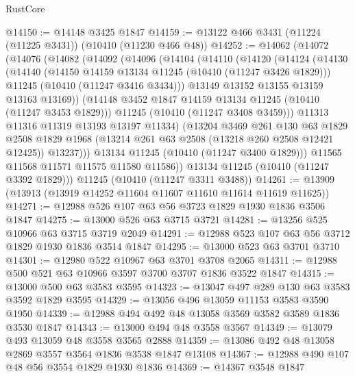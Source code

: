 \begin{lexlean}{RustCore}
\begin{coremodule}
@14150 := @14148 @3425 @1847
@14159 := @13122 @466 @3431 (@11224 (@11225 @3431)) (@10410 (@11230 @466 @48))
@14252 := @14062
    (@14072
      (@14076
        (@14082
          (@14092
            (@14096
              (@14104
                (@14110
                  (@14120
                    (@14124
                      (@14130
                        (@14140
                          (@14150 @14159 @13134 @11245 (@10410 (@11247 @3426 @1829)))
                          @11245
                          (@10410 (@11247 @3416 @3434)))
                        @13149
                        @13152
                        @13155
                        @13159
                        @13163
                        @13169))
                    (@14148 @3452 @1847 @14159 @13134 @11245 (@10410 (@11247 @3453 @1829)))
                    @11245
                    (@10410 (@11247 @3408 @3459)))
                  @11313
                  @11316
                  @11319
                  @13193
                  @13197
                  @11334)
                (@13204
                  @3469
                  @261
                  @130
                  @63
                  @1829
                  @2508
                  @1829
                  @1968
                  (@13214 @261 @63 @2508 (@13218 @260 @2508 @12421 @12425))
                  @13237)))
            @13134
            @11245
            (@10410 (@11247 @3400 @1829)))
          @11565
          @11568
          @11571
          @11575
          @11580
          @11586))
      @13134
      @11245
      (@10410 (@11247 @3392 @1829)))
    @11245
    (@10410 (@11247 @3311 @3488))
@14261 := @13909 (@13913 (@13919 @14252 @11604 @11607 @11610 @11614 @11619 @11625))
@14271 := @12988 @526 @107 @63 @56 @3723 @1829 @1930 @1836 @3506 @1847
@14275 := @13000 @526 @63 @3715 @3721
@14281 := @13256 @525 @10966 @63 @3715 @3719 @2049
@14291 := @12988 @523 @107 @63 @56 @3712 @1829 @1930 @1836 @3514 @1847
@14295 := @13000 @523 @63 @3701 @3710
@14301 := @12980 @522 @10967 @63 @3701 @3708 @2065
@14311 := @12988 @500 @521 @63 @10966 @3597 @3700 @3707 @1836 @3522 @1847
@14315 := @13000 @500 @63 @3583 @3595
@14323 := @13047 @497 @289 @130 @63 @3583 @3592 @1829 @3595
@14329 := @13056 @496 @13059 @11153 @3583 @3590 @1950
@14339 := @12988 @494 @492 @48 @13058 @3569 @3582 @3589 @1836 @3530 @1847
@14343 := @13000 @494 @48 @3558 @3567
@14349 := @13079 @493 @13059 @48 @3558 @3565 @2888
@14359 := @13086 @492 @48 @13058 @2869 @3557 @3564 @1836 @3538 @1847 @13108
@14367 := @12988 @490 @107 @48 @56 @3554 @1829 @1930 @1836
@14369 := @14367 @3548 @1847

\end{coremodule}
\end{lexlean}
